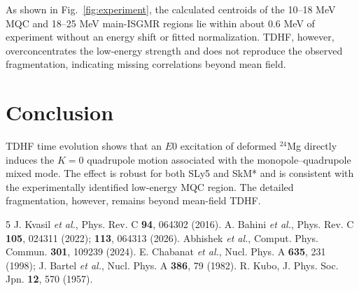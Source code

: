 \documentclass[twocolumn,amsmath,amssymb]{snp}
\begin{document}
As shown in Fig.~\ref{fig:experiment}, the calculated centroids of the
10--18 MeV MQC and 18--25 MeV main-ISGMR regions lie within about $0.6$ MeV
of experiment without an energy shift or fitted normalization. TDHF,
however, overconcentrates the low-energy strength and does not reproduce the
observed fragmentation, indicating missing correlations beyond mean field.

\section*{Conclusion}
TDHF time evolution shows that an $E0$ excitation of deformed $^{24}$Mg
directly induces the $K=0$ quadrupole motion associated with the
monopole--quadrupole mixed mode. The effect is robust for both SLy5 and
SkM* and is consistent with the experimentally identified low-energy MQC
region. The detailed fragmentation, however, remains beyond mean-field TDHF.

{\footnotesize
\begin{thebibliography}{5}
 J. Kvasil \textit{et al.}, Phys. Rev. C \textbf{94},
064302 (2016).
 A. Bahini \textit{et al.}, Phys. Rev. C \textbf{105},
024311 (2022); \textbf{113}, 064313 (2026).
 Abhishek \textit{et al.}, Comput. Phys. Commun.
\textbf{301}, 109239 (2024).
 E. Chabanat \textit{et al.}, Nucl. Phys. A \textbf{635}, 231
(1998); J. Bartel \textit{et al.}, Nucl. Phys. A \textbf{386}, 79 (1982).
 R. Kubo, J. Phys. Soc. Jpn. \textbf{12}, 570 (1957).
\end{thebibliography}
}
\end{document}
